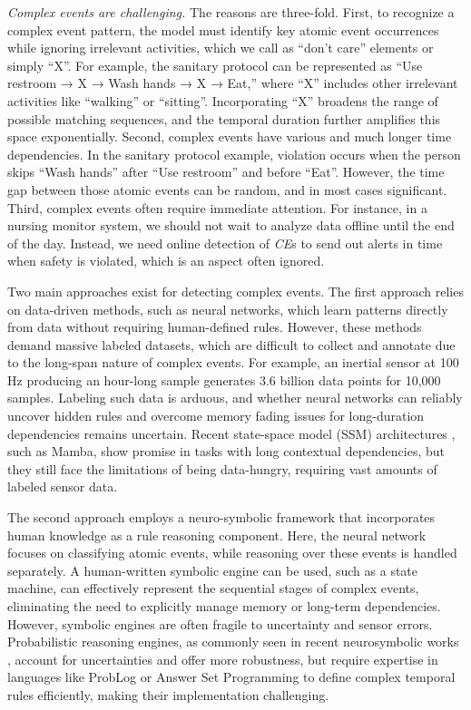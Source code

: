 \emph{Complex events are challenging.} The reasons are three-fold. First, to recognize a complex event pattern, the model must identify key atomic event occurrences while ignoring irrelevant activities, which we call as ``don’t care'' elements or simply ``X''. For example, the sanitary protocol can be represented as ``Use restroom → X → Wash hands → X → Eat,'' where ``X'' includes other irrelevant activities like ``walking'' or ``sitting''. Incorporating ``X'' broadens the range of possible matching sequences, and the temporal duration further amplifies this space exponentially. Second, complex events have various and much longer time dependencies. In the sanitary protocol example, violation occurs when the person skips ``Wash hands'' after ``Use restroom'' and before ``Eat''. However, the time gap between those atomic events can be random, and in most cases significant. Third, complex events often require immediate attention. For instance, in a nursing monitor system, we should not wait to analyze data offline until the end of the day. Instead, we need online detection of \emph{CE}s to send out alerts in time when safety is violated, which is an aspect often ignored.

Two main approaches exist for detecting complex events. The first approach relies on data-driven methods, such as neural networks, which learn patterns directly from data without requiring human-defined rules. However, these methods demand massive labeled datasets, which are difficult to collect and annotate due to the long-span nature of complex events. For example, an inertial sensor at 100 Hz producing an hour-long sample generates 3.6 billion data points for 10,000 samples. Labeling such data is arduous, and whether neural networks can reliably uncover hidden rules and overcome memory fading issues for long-duration dependencies remains uncertain. Recent state-space model (SSM) architectures \cite{gu2022ssm, gu2024mamba, dao2024mamba2}, such as Mamba, show promise in tasks with long contextual dependencies, but they still face the limitations of being data-hungry, requiring vast amounts of labeled sensor data.

The second approach employs a neuro-symbolic framework that incorporates human knowledge as a rule reasoning component. Here, the neural network focuses on classifying atomic events, while reasoning over these events is handled separately. A human-written symbolic engine can be used, such as a state machine, can effectively represent the sequential stages of complex events, eliminating the need to explicitly manage memory or long-term dependencies. However, symbolic engines are often fragile to uncertainty and sensor errors. Probabilistic reasoning engines, as commonly seen in recent neurosymbolic works \cite{deepproblog, deepproblog2,scallop,neurasp,slash}, account for uncertainties and offer more robustness, but require expertise in languages like ProbLog or Answer Set Programming \cite{problog,asp} to define complex temporal rules efficiently, making their implementation challenging.


